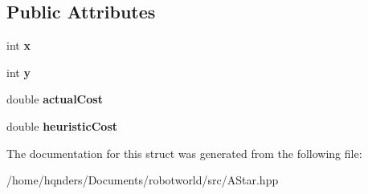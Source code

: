 \subsection*{Public Attributes}
\begin{DoxyCompactItemize}
\item 
int {\bfseries x}\hypertarget{struct_path_algorithm_1_1_vertex_afe7ba337aa9af618c18c7ab19da65ea9}{}\label{struct_path_algorithm_1_1_vertex_afe7ba337aa9af618c18c7ab19da65ea9}

\item 
int {\bfseries y}\hypertarget{struct_path_algorithm_1_1_vertex_ae6428b0c59bbbcd5aad9cf244a38bef2}{}\label{struct_path_algorithm_1_1_vertex_ae6428b0c59bbbcd5aad9cf244a38bef2}

\item 
double {\bfseries actual\+Cost}\hypertarget{struct_path_algorithm_1_1_vertex_a8bac4752dead7e6f0eb4fe099eae1eaf}{}\label{struct_path_algorithm_1_1_vertex_a8bac4752dead7e6f0eb4fe099eae1eaf}

\item 
double {\bfseries heuristic\+Cost}\hypertarget{struct_path_algorithm_1_1_vertex_a316a72f6d405096010224df1a78b8c4d}{}\label{struct_path_algorithm_1_1_vertex_a316a72f6d405096010224df1a78b8c4d}

\end{DoxyCompactItemize}


The documentation for this struct was generated from the following file\+:\begin{DoxyCompactItemize}
\item 
/home/hqnders/\+Documents/robotworld/src/A\+Star.\+hpp\end{DoxyCompactItemize}
